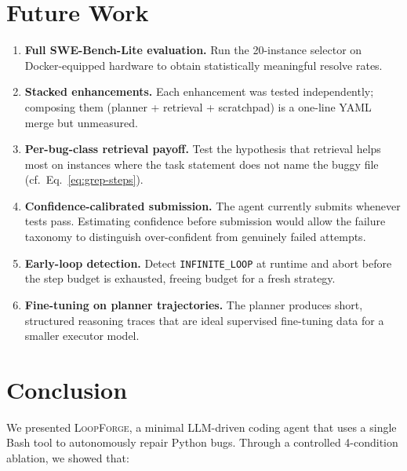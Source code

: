 \documentclass[11pt]{article}
\begin{document}
\section{Future Work}
\label{sec:future}

\begin{enumerate}[label=\textbf{F\arabic*.}]
  \item \textbf{Full SWE-Bench-Lite evaluation.}  Run the 20-instance
        selector on Docker-equipped hardware to obtain statistically
        meaningful resolve rates.
  \item \textbf{Stacked enhancements.}  Each enhancement was tested
        independently; composing them (planner + retrieval + scratchpad)
        is a one-line YAML merge but unmeasured.
  \item \textbf{Per-bug-class retrieval payoff.}  Test the hypothesis that
        retrieval helps most on instances where the task statement does not
        name the buggy file (cf.\ Eq.~\eqref{eq:grep-steps}).
  \item \textbf{Confidence-calibrated submission.}  The agent currently
        submits whenever tests pass.  Estimating confidence before
        submission would allow the failure taxonomy to distinguish
        over-confident from genuinely failed attempts.
  \item \textbf{Early-loop detection.}  Detect \texttt{INFINITE\_LOOP} at
        runtime and abort before the step budget is exhausted, freeing
        budget for a fresh strategy.
  \item \textbf{Fine-tuning on planner trajectories.}  The planner
        produces short, structured reasoning traces that are ideal
        supervised fine-tuning data for a smaller executor model.
\end{enumerate}

\section{Conclusion}
\label{sec:conclusion}

We presented \textsc{LoopForge}, a minimal LLM-driven coding agent that uses
a single Bash tool to autonomously repair Python bugs.  Through a controlled
4-condition ablation, we showed that:
\end{document}
